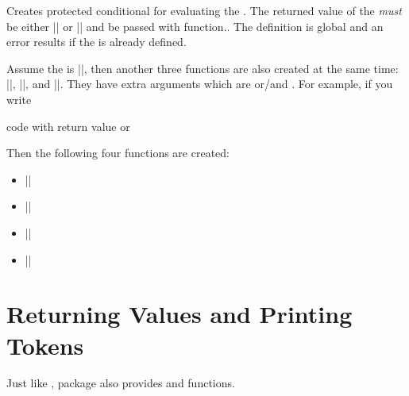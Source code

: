 \documentclass[oneside]{book}
\providecommand*\LuaTeX{\hologo{LuaTeX}}
\begin{document}
\begin{function}{\prgNewConditional}
\begin{syntax}
   
\end{syntax}
Creates protected conditional  for evaluating the .
The returned value of the  \emph{must} be either |\cTrueBool|
or |\cFalseBool| and be passed with  function..
The definition is global and an error results if the  is already defined.
\par
Assume the  is |\fooIfBar|, then another three functions
are also created at the same time: |\fooIfBarT|, |\fooIfBarF|, and |\fooIfBarTF|.
They have extra arguments which are  or/and .
For example, if you write
\begin{codehigh}
\prgNewConditional {} {code with return value \cTrueBool or \cFalseBool}
\end{codehigh}
Then the following four functions are created:
\begin{itemize}
 \item |\fooIfBar|  
 \item |\fooIfBarT|   
 \item |\fooIfBarF|   
 \item |\fooIfBarTF|    
\end{itemize}
\end{function}

\section{Returning Values and Printing Tokens}

Just like \LuaTeX,  package also provides  and  functions.
\end{document}
